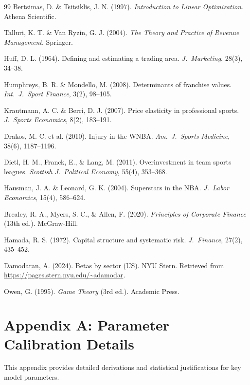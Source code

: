 \documentclass{mcmthesis}
\begin{document}
\begin{thebibliography}{99}
 Bertsimas, D. \& Tsitsiklis, J. N. (1997). \textit{Introduction to Linear Optimization}. Athena Scientific.

 Talluri, K. T. \& Van Ryzin, G. J. (2004). \textit{The Theory and Practice of Revenue Management}. Springer.

 Huff, D. L. (1964). Defining and estimating a trading area. \textit{J.\ Marketing}, 28(3), 34--38.

 Humphreys, B. R. \& Mondello, M. (2008). Determinants of franchise values. \textit{Int.\ J.\ Sport Finance}, 3(2), 98--105.

 Krautmann, A. C. \& Berri, D. J. (2007). Price elasticity in professional sports. \textit{J.\ Sports Economics}, 8(2), 183--191.

 Drakos, M. C. et al. (2010). Injury in the WNBA. \textit{Am.\ J.\ Sports Medicine}, 38(6), 1187--1196.

 Dietl, H. M., Franck, E., \& Lang, M. (2011). Overinvestment in team sports leagues. \textit{Scottish J.\ Political Economy}, 55(4), 353--368.

 Hausman, J. A. \& Leonard, G. K. (2004). Superstars in the NBA. \textit{J.\ Labor Economics}, 15(4), 586--624.

 Brealey, R. A., Myers, S. C., \& Allen, F. (2020). \textit{Principles of Corporate Finance} (13th ed.). McGraw-Hill.

 Hamada, R. S. (1972). Capital structure and systematic risk. \textit{J.\ Finance}, 27(2), 435--452.

 Damodaran, A. (2024). Betas by sector (US). NYU Stern. Retrieved from \url{https://pages.stern.nyu.edu/~adamodar}.

 Owen, G. (1995). \textit{Game Theory} (3rd ed.). Academic Press.

\end{thebibliography}

\newpage

\appendix
\section*{Appendix A: Parameter Calibration Details}

This appendix provides detailed derivations and statistical justifications for key model parameters.
\end{document}
